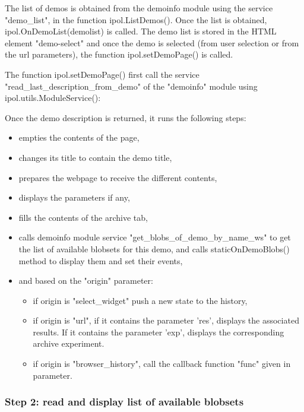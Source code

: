 The list of demos is obtained from the demoinfo module using the service "demo\_list",
in the function ipol.ListDemos(). Once the list is obtained, 
ipol.OnDemoList(demolist) is called.
The demo list is stored in the HTML element "demo-select" and once the demo is
selected (from user selection or from the url parameters), the function 
ipol.setDemoPage() is called.

The function ipol.setDemoPage() first call the service "read\_last\-\_des\-crip\-tion\_from\_demo"
of the "demoinfo" module using ipol.utils.ModuleService():


Once the demo description is returned, it runs the following steps:
\begin{itemize}
  \item empties the contents of the page,
  \item changes its title to contain the demo title,
  \item prepares the webpage to receive the different contents,
  \item displays the parameters if any,
  \item fills the contents of the archive tab,
  \item calls demoinfo module service "get\_blobs\-\_of\-\_demo\-\_by\-\_name\-\_ws"
to get the list of available blobsets for this demo, and calls staticOnDemoBlobs()
method to display them and set their events,
  \item and based on the "origin" parameter:
    \begin{itemize}
      \item if origin is "select\_widget" push a new state to the history,
      \item if origin is "url", if it contains the parameter 'res', displays
            the associated results. If it contains the parameter 'exp', displays
            the corresponding archive experiment.
      \item if origin is "browser\_history", call the callback function "func" 
            given in parameter.
    \end{itemize}
\end{itemize}

\subsubsection{Step 2: read and display list of available blobsets}

